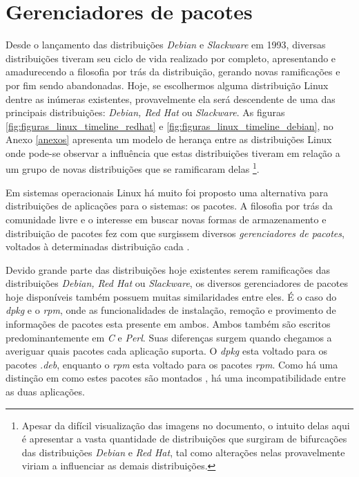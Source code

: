 \section{Gerenciadores de pacotes} %
\label{sec:distribui_es_abordadas}


Desde o lançamento das distribuições \textit{Debian} e \textit{Slackware} em 1993, diversas distribuições tiveram seu ciclo de vida realizado por completo, apresentando e amadurecendo a filosofia por trás da distribuição, gerando novas ramificações e por fim sendo abandonadas. Hoje, se escolhermos alguma distribuição Linux dentre as inúmeras existentes, provavelmente ela será descendente de uma das principais distribuições: \textit{Debian, Red Hat} ou \textit{Slackware}. %
As figuras \ref{fig:figuras_linux_timeline_redhat} e \ref{fig:figuras_linux_timeline_debian}, no Anexo \ref{anexos} apresenta um modelo de herança entre as distribuições Linux onde pode-se observar a influência que estas distribuições tiveram em relação a um grupo de novas distribuições que se ramificaram delas%
\footnote{Apesar da difícil visualização das imagens no documento, o intuito delas aqui é apresentar a vasta quantidade de distribuições que surgiram de bifurcações das distribuições \textit{Debian} e \textit{Red Hat}, tal como alterações nelas provavelmente viriam a influenciar as demais distribuições.}.

Em sistemas operacionais Linux há muito foi proposto uma alternativa para distribuições de aplicações para o sistemas: os pacotes. A filosofia por trás da comunidade livre \cite{bretthauer2001open} e o interesse em buscar novas formas de armazenamento e distribuição de pacotes fez com que surgissem diversos \textit{gerenciadores de pacotes}, voltados à determinadas distribuição  cada \cite{beck2002linux}.

Devido grande parte das distribuições hoje existentes serem ramificações das distribuições \textit{Debian, Red Hat} ou \textit{Slackware},%
os diversos gerenciadores de pacotes hoje disponíveis também possuem muitas similaridades entre eles.
É o caso do \textit{dpkg} e o \textit{rpm}, onde as funcionalidades de instalação, remoção e provimento de informações de pacotes esta presente em ambos. Ambos também são escritos predominantemente em \textit{C} e \textit{Perl}. Suas diferenças surgem quando chegamos a averiguar quais pacotes cada aplicação suporta. O \textit{dpkg} esta voltado para os pacotes \textit{.deb}, enquanto o \textit{rpm} esta voltado para os pacotes \textit{rpm}. Como há uma distinção em como estes pacotes são montados \cite{bailey1997maximum}, há uma incompatibilidade entre as duas aplicações. 

